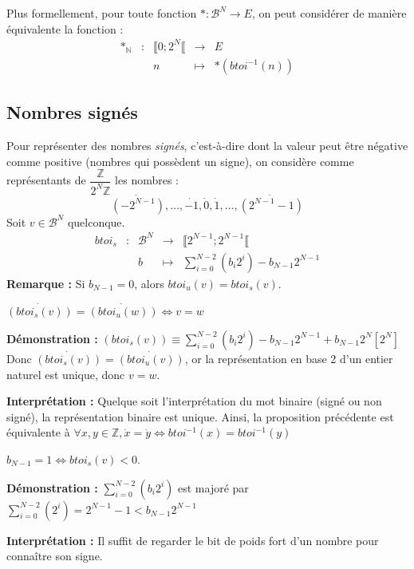 \documentclass[../../main.tex]{subfiles}
\begin{document}
Plus formellement, pour toute fonction $\ast : \mathcal{B}^{N} \rightarrow E$, on peut considérer de manière équivalente la fonction :
$$
\begin{array}{lclcl}
\ast_{\mathbb{N}} & : & \llbracket 0;2^{N}\llbracket  & \rightarrow & E \\
     &   & n & \mapsto & \ast{(btoi^{-1}{(n)})}
\end{array}
$$
\subsection{Nombres signés} \label{sub:nombres_sign_s}
Pour représenter des nombres \textit{signés}, c'est-à-dire dont la valeur peut être négative comme positive (nombres qui possèdent un signe), on considère comme représentants de $\dfrac{\mathbb{Z}}{2^{N}\mathbb{Z}}$ les nombres :
$$\dot{(-2^{N-1})}, \dots, \dot{-1}, \dot{0}, \dot{1}, \dots, \dot{(2^{N-1}-1)}$$
Soit $v\in{\mathcal{B}^{N}}$ quelconque.
$$
\begin{array}{lclcl}
btoi_{s} & : & \mathcal{B}^{N} & \rightarrow & \llbracket 2^{N-1}; 2^{N-1}\llbracket  \\
     &   & b & \mapsto & \displaystyle\sum_{i = 0}^{N-2}(b_{i}2^{i}) - b_{N-1}2^{N-1}
\end{array}
$$
\textbf{Remarque :} Si $b_{N-1} = 0$, alors $btoi_{u}(v) = btoi_{s}(v)$.

\proposition{} $\dot{(btoi_{s}(v))} = \dot{(btoi_{u}(w))} \Leftrightarrow v = w$

\textbf{Démonstration :} $(btoi_{s}(v)) \equiv \displaystyle\sum_{i = 0}^{N-2}(b_{i}2^{i}) - b_{N-1}2^{N-1} + b_{N-1}2^{N} [2^{N}]$ \newline
Donc $\dot{(btoi_{s}(v))} = \dot{(btoi_{u}(v))}$, or la représentation en base 2 d'un entier naturel est unique, donc $v = w$.

\textbf{Interprétation :} Quelque soit l'interprétation du mot binaire (signé ou non signé), la représentation binaire est unique. Ainsi, la proposition précédente est équivalente à $\forall{x, y\in{\mathbb{Z}}}, \dot{x} = \dot{y} \Leftrightarrow btoi^{-1}(x) = btoi^{-1}(y)$

\proposition{} $b_{N-1} = 1 \Leftrightarrow btoi_{s}(v) < 0$.

\textbf{Démonstration :} $\displaystyle\sum_{i = 0}^{N-2}(b_{i}2^{i})$ est majoré par $\displaystyle\sum_{i = 0}^{N-2}(2^{i}) = 2^{N-1} - 1 < b_{N-1}2^{N-1}$

\textbf{Interprétation :} Il suffit de regarder le bit de poids fort d'un nombre pour connaître son signe.
\end{document}
